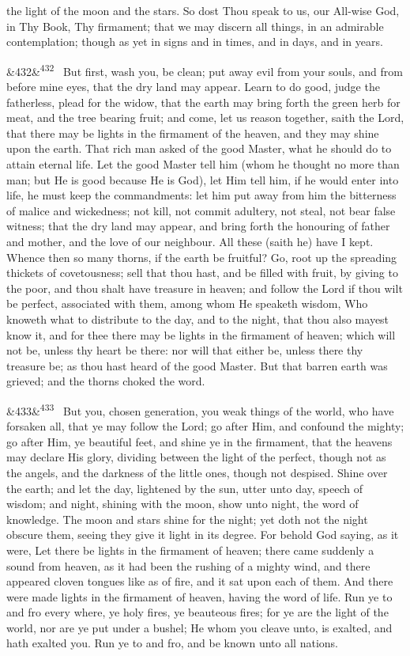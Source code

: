 \documentclass[12pt]{article}
\newcommand{\para}[1][]{\par\noindent\ifx&#1&\else\textsuperscript{\footnotesize #1}~\fi}
\begin{document}
the light of the moon and the stars. So dost Thou speak to us, our All-wise God, in Thy Book, Thy firmament; that we may discern all things, in an admirable contemplation; though as yet in signs and in times, and in days, and in years.

\para[432] But first, wash you, be clean; put away evil from your souls, and from before mine eyes, that the dry land may appear. Learn to do good, judge the fatherless, plead for the widow, that the earth may bring forth the green herb for meat, and the tree bearing fruit; and come, let us reason together, saith the Lord, that there may be lights in the firmament of the heaven, and they may shine upon the earth. That rich man asked of the good Master, what he should do to attain eternal life. Let the good Master tell him (whom he thought no more than man; but He is good because He is God), let Him tell him, if he would enter into life, he must keep the commandments: let him put away from him the bitterness of malice and wickedness; not kill, not commit adultery, not steal, not bear false witness; that the dry land may appear, and bring forth the honouring of father and mother, and the love of our neighbour. All these (saith he) have I kept. Whence then so many thorns, if the earth be fruitful? Go, root up the spreading thickets of covetousness; sell that thou hast, and be filled with fruit, by giving to the poor, and thou shalt have treasure in heaven; and follow the Lord if thou wilt be perfect, associated with them, among whom He speaketh wisdom, Who knoweth what to distribute to the day, and to the night, that thou also mayest know it, and for thee there may be lights in the firmament of heaven; which will not be, unless thy heart be there: nor will that either be, unless there thy treasure be; as thou hast heard of the good Master. But that barren earth was grieved; and the thorns choked the word.

\para[433] But you, chosen generation, you weak things of the world, who have forsaken all, that ye may follow the Lord; go after Him, and confound the mighty; go after Him, ye beautiful feet, and shine ye in the firmament, that the heavens may declare His glory, dividing between the light of the perfect, though not as the angels, and the darkness of the little ones, though not despised. Shine over the earth; and let the day, lightened by the sun, utter unto day, speech of wisdom; and night, shining with the moon, show unto night, the word of knowledge. The moon and stars shine for the night; yet doth not the night obscure them, seeing they give it light in its degree. For behold God saying, as it were, Let there be lights in the firmament of heaven; there came suddenly a sound from heaven, as it had been the rushing of a mighty wind, and there appeared cloven tongues like as of fire, and it sat upon each of them. And there were made lights in the firmament of heaven, having the word of life. Run ye to and fro every where, ye holy fires, ye beauteous fires; for ye are the light of the world, nor are ye put under a bushel; He whom you cleave unto, is exalted, and hath exalted you. Run ye to and fro, and be known unto all nations.
\end{document}
